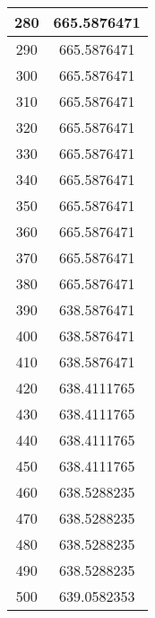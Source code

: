 \documentclass[a4paper,12pt]{article}
\numberwithin{equation}{section}
\begin{document}
\begin{appendix}
\begin{center}
\begin{longtable}{cc}
		280 & 665.5876471 \\ \hline
		290 & 665.5876471 \\ \hline
		300 & 665.5876471 \\ \hline
		310 & 665.5876471 \\ \hline
		320 & 665.5876471 \\ \hline
		330 & 665.5876471 \\ \hline
		340 & 665.5876471 \\ \hline
		350 & 665.5876471 \\ \hline
		360 & 665.5876471 \\ \hline
		370 & 665.5876471 \\ \hline
		380 & 665.5876471 \\ \hline
		390 & 638.5876471 \\ \hline
		400 & 638.5876471 \\ \hline
		410 & 638.5876471 \\ \hline
		420 & 638.4111765 \\ \hline
		430 & 638.4111765 \\ \hline
		440 & 638.4111765 \\ \hline
		450 & 638.4111765 \\ \hline
		460 & 638.5288235 \\ \hline
		470 & 638.5288235 \\ \hline
		480 & 638.5288235 \\ \hline
		490 & 638.5288235 \\ \hline
		500 & 639.0582353 \\ \hline
\end{longtable}
\end{center}

\end{appendix}
\end{document}
